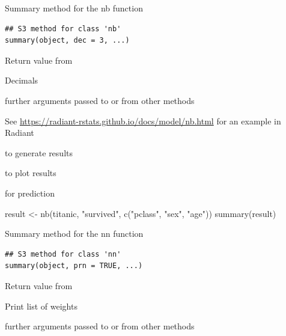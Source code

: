 \documentclass[a4paper]{book}
\begin{document}
%
\begin{Description}
Summary method for the nb function
\end{Description}
%
\begin{Usage}
\begin{verbatim}
## S3 method for class 'nb'
summary(object, dec = 3, ...)
\end{verbatim}
\end{Usage}
%
\begin{Arguments}
\begin{ldescription}
\item[\code{object}] Return value from 

\item[\code{dec}] Decimals

\item[\code{...}] further arguments passed to or from other methods
\end{ldescription}
\end{Arguments}
%
\begin{Details}
See \url{https://radiant-rstats.github.io/docs/model/nb.html} for an example in Radiant
\end{Details}
%
\begin{SeeAlso}
 to generate results

 to plot results

 for prediction
\end{SeeAlso}
%
\begin{Examples}
\begin{ExampleCode}
result <- nb(titanic, "survived", c("pclass", "sex", "age"))
summary(result)

\end{ExampleCode}
\end{Examples}
%
\begin{Description}
Summary method for the nn function
\end{Description}
%
\begin{Usage}
\begin{verbatim}
## S3 method for class 'nn'
summary(object, prn = TRUE, ...)
\end{verbatim}
\end{Usage}
%
\begin{Arguments}
\begin{ldescription}
\item[\code{object}] Return value from 

\item[\code{prn}] Print list of weights

\item[\code{...}] further arguments passed to or from other methods
\end{ldescription}
\end{Arguments}
\end{document}
